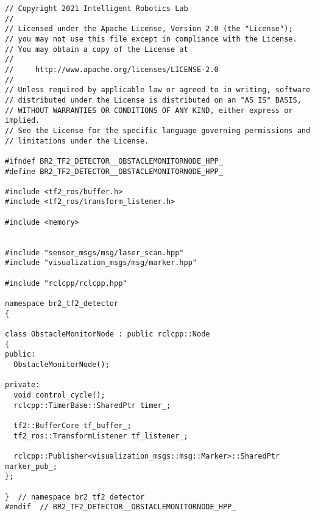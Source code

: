  \footnotesize
\begin{tcolorbox}[sharp corners, colframe=gray!80, colback=LightGray, left=0pt, top=0pt, bottom=0pt, title=\texttt{br2\_tf2\_detector/include/br2\_tf2\_detector/ObstacleMonitorNode.hpp}]
  \begin{verbatim}
// Copyright 2021 Intelligent Robotics Lab
//
// Licensed under the Apache License, Version 2.0 (the "License");
// you may not use this file except in compliance with the License.
// You may obtain a copy of the License at
//
//     http://www.apache.org/licenses/LICENSE-2.0
//
// Unless required by applicable law or agreed to in writing, software
// distributed under the License is distributed on an "AS IS" BASIS,
// WITHOUT WARRANTIES OR CONDITIONS OF ANY KIND, either express or implied.
// See the License for the specific language governing permissions and
// limitations under the License.

#ifndef BR2_TF2_DETECTOR__OBSTACLEMONITORNODE_HPP_
#define BR2_TF2_DETECTOR__OBSTACLEMONITORNODE_HPP_

#include <tf2_ros/buffer.h>
#include <tf2_ros/transform_listener.h>

#include <memory>


#include "sensor_msgs/msg/laser_scan.hpp"
#include "visualization_msgs/msg/marker.hpp"

#include "rclcpp/rclcpp.hpp"

namespace br2_tf2_detector
{

class ObstacleMonitorNode : public rclcpp::Node
{
public:
  ObstacleMonitorNode();

private:
  void control_cycle();
  rclcpp::TimerBase::SharedPtr timer_;

  tf2::BufferCore tf_buffer_;
  tf2_ros::TransformListener tf_listener_;

  rclcpp::Publisher<visualization_msgs::msg::Marker>::SharedPtr marker_pub_;
};

}  // namespace br2_tf2_detector
#endif  // BR2_TF2_DETECTOR__OBSTACLEMONITORNODE_HPP_
    \end{verbatim}
    \end{tcolorbox}
  \normalsize

